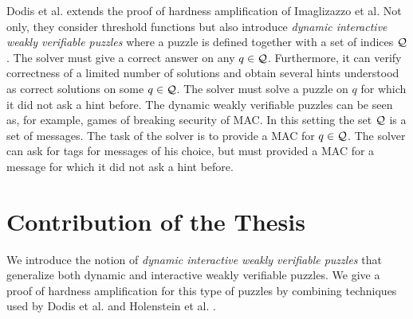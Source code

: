 Dodis et al. \cite{dodis2009security} extends the proof of hardness amplification of Imaglizazzo et al.
Not only, they consider threshold functions but also introduce \textit{dynamic interactive weakly verifiable puzzles} where a puzzle is defined together with a set of indices $\mathcal{Q}$.
The solver must give a correct answer on any $q \in \mathcal{Q}$. Furthermore, it can verify correctness of a limited number of solutions and
obtain several hints understood as correct solutions on some $q \in \mathcal{Q}$. The solver must solve a puzzle on $q$ for which it did not ask a hint before.
The dynamic weakly verifiable puzzles can be seen as, for example, games of breaking security of MAC.
In this setting the set $\mathcal{Q}$ is a set of messages. The task of the solver is to provide a MAC for $q \in \mathcal{Q}$.
The solver can ask for tags for messages of his choice, but must provided a MAC for a message for which it did not ask a hint before.



\section{Contribution of the Thesis}
We introduce the notion of \textit{dynamic interactive weakly verifiable puzzles} that generalize both dynamic and interactive
weakly verifiable puzzles.
We give a proof of hardness amplification for this type of puzzles by combining techniques
used by Dodis et al. \cite{dodis2009security} and Holenstein et al. \cite{holenstein2011general}.

